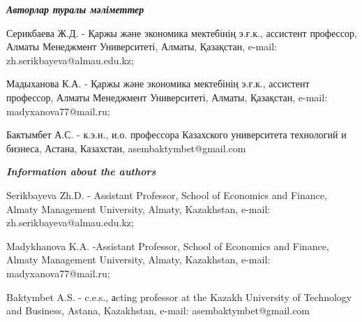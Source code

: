 \begin{authorinfo}
\emph{{\bfseries Авторлар туралы мәліметтер}}

Серикбаева Ж.Д. - Қаржы және экономика мектебінің э.ғ.к., ассистент
профессор, Алматы Менеджмент Университеті, Алматы, Қазақстан, e-mail:
zh.serikbayeva@almau.edu.kz;

Мадыханова К.А. - Қаржы және экономика мектебінің э.ғ.к., ассистент
профессор, Алматы Менеджмент Университеті, Алматы, Қазақстан, e-mail:
madyxanova77@mail.ru;

Бактымбет А.С. - к.э.н., и.о. профессора Казахского университета
технологий и бизнеса, Астана, Казахстан,
asembaktymbet@gmail.com

\emph{{\bfseries Information about the authors}}

Serikbayeva Zh.D. - Assistant Professor, School of Economics and
Finance, Almaty Management University, Almaty, Kazakhstan, e-mail:
zh.serikbayeva@almau.edu.kz;

Madykhanova K.A. -Assistant Professor, School of Economics and Finance,
Almaty Management University, Almaty, Kazakhstan, e-mail:
madyxanova77@mail.ru;

Baktymbet A.S. - c.e.s., аcting professor at the Kazakh University of
Technology and Business, Astana, Kazakhstan, e-mail:
asembaktymbet@gmail.com
\end{authorinfo}

